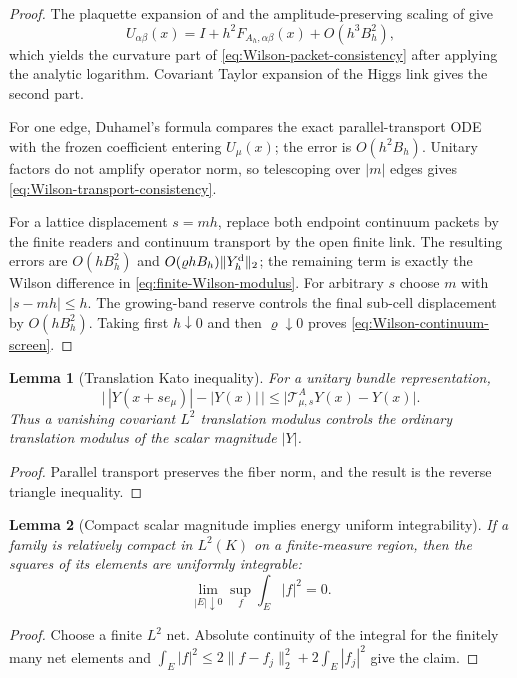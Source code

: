 \documentclass[11pt]{article}
\numberwithin{equation}{section}
\newtheorem{lemma}[lemma]{Lemma}
\theoremstyle{definition}
\theoremstyle{remark}
\newcommand{\norm}[1]{\lVert#1\rVert}
\newcommand{\abs}[1]{\lvert#1\rvert}
\begin{document}
\begin{proof}
The plaquette expansion of  and the
amplitude-preserving scaling of  give
\[
 U_{\alpha\beta}(x)
 =I+h^2F_{A_h,\alpha\beta}(x)+O(h^3B_h^2),
\]
which yields the curvature part of
\eqref{eq:Wilson-packet-consistency} after applying the analytic logarithm.
Covariant Taylor expansion of the Higgs link gives the second part.

For one edge, Duhamel's formula compares the exact parallel-transport ODE with
the frozen coefficient entering $U_\mu(x)$; the error is $O(h^2B_h)$.
Unitary factors do not amplify operator norm, so telescoping over $|m|$ edges
gives \eqref{eq:Wilson-transport-consistency}.

For a lattice displacement $s=mh$, replace both endpoint continuum packets by
the finite readers and continuum transport by the open finite link.  The
resulting errors are $O(hB_h^2)$ and
$O(\varrho hB_h)\norm{Y_h^{\rm d}}_2$; the remaining term is exactly the
Wilson difference in \eqref{eq:finite-Wilson-modulus}.  For arbitrary $s$
choose $m$ with $|s-mh|\le h$.  The growing-band reserve controls the final
sub-cell displacement by $O(hB_h^2)$.  Taking first $h\downarrow0$ and then
$\varrho\downarrow0$ proves \eqref{eq:Wilson-continuum-screen}.
\end{proof}

\begin{lemma}[Translation Kato inequality]
\label{lem:translation-Kato}
For a unitary bundle representation,
\begin{equation}
 \bigl|\,|Y(x+s e_\mu)|-|Y(x)|\,\bigr|
 \le\abs{\mathscr T^A_{\mu,s}Y(x)-Y(x)}.
 \label{eq:translation-Kato}
\end{equation}
Thus a vanishing covariant $L^2$ translation modulus controls the ordinary
translation modulus of the scalar magnitude $|Y|$.
\end{lemma}
\begin{proof}
Parallel transport preserves the fiber norm, and the result is the reverse
triangle inequality.
\end{proof}

\begin{lemma}[Compact scalar magnitude implies energy uniform integrability]
\label{lem:compact-magnitude-ui}
If a family is relatively compact in $L^2(K)$ on a finite-measure region,
then the squares of its elements are uniformly integrable:
\begin{equation}
 \lim_{|E|\downarrow0}\sup_f\int_E|f|^2=0.
 \label{eq:compact-magnitude-ui}
\end{equation}
\end{lemma}
\begin{proof}
Choose a finite $L^2$ net.  Absolute continuity of the integral for the
finitely many net elements and
$\int_E|f|^2\le2\norm{f-f_j}_2^2+2\int_E|f_j|^2$ give the claim.
\end{proof}
\end{document}
